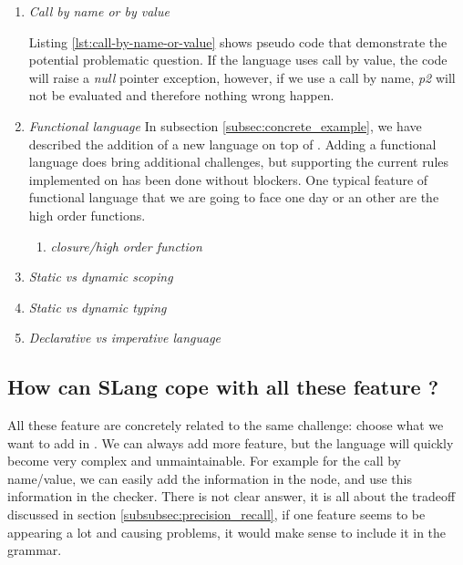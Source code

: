 \begin{enumerate}
	\item \textit{Call by name or by value} \newline
	
	
	Listing \ref{lst:call-by-name-or-value} shows pseudo code that demonstrate the potential problematic question. If the language uses call by value, the code will raise a \emph{null} pointer exception, however, if we use a call by name, \emph{p2} will not be evaluated and therefore nothing wrong happen. \newline
	\item \textit{Functional language} \newline
	In subsection \ref{subsec:concrete_example}, we have described the addition of a new language on top of \slang{}.
	Adding a functional language does bring additional challenges, but supporting the current rules implemented on \slang{} has been done without blockers. \newline
	One typical feature of functional language that we are going to face one day or an other are the high order functions.
	\begin{enumerate}
		\item \textit{closure/high order function} \newline
	\end{enumerate}

	\item \textit{Static vs dynamic scoping} \newline
	\item \textit{Static vs dynamic typing} \newline
	\item \textit{Declarative vs imperative language} \newline
\end{enumerate}

\subsection{How can SLang cope with all these feature ?}
\label{subsec:how_can_slang_cope_with_features}

All these feature are concretely related to the same challenge: choose what we want to add in \slang{}. 
We can always add more feature, but the language will quickly become very complex and unmaintainable. For example for the call by name/value, we can easily add the information in the node, and use this information in the checker. 
There is not clear answer, it is all about the tradeoff discussed in section \ref{subsubsec:precision_recall}, if one feature seems to be appearing a lot and causing problems, it would make sense to include it in the grammar.
